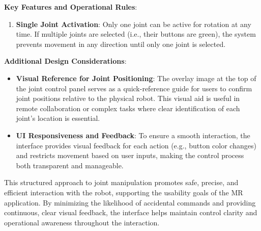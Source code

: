     \textbf{Key Features and Operational Rules}:
    \begin{enumerate}
        \item \textbf{Single Joint Activation}: Only one joint can be active for rotation at any time. If multiple joints are selected (i.e., their buttons are green), the system prevents movement in any direction until only one joint is selected.

    \end{enumerate}

    \textbf{Additional Design Considerations}:
    \begin{itemize}
        \item \textbf{Visual Reference for Joint Positioning}: The overlay image at the top of the joint control panel serves as a quick-reference guide for users to confirm joint positions relative to the physical robot. This visual aid is useful in remote collaboration or complex tasks where clear identification of each joint’s location is essential.

        \item \textbf{UI Responsiveness and Feedback}: To ensure a smooth interaction, the interface provides visual feedback for each action (e.g., button color changes) and restricts movement based on user inputs, making the control process both transparent and manageable.
    \end{itemize}

    This structured approach to joint manipulation promotes safe, precise, and efficient interaction with the robot, supporting the usability goals of the \ac{MR} application. By minimizing the likelihood of accidental commands and providing continuous, clear visual feedback, the interface helps maintain control clarity and operational awareness throughout the interaction.


    
    
